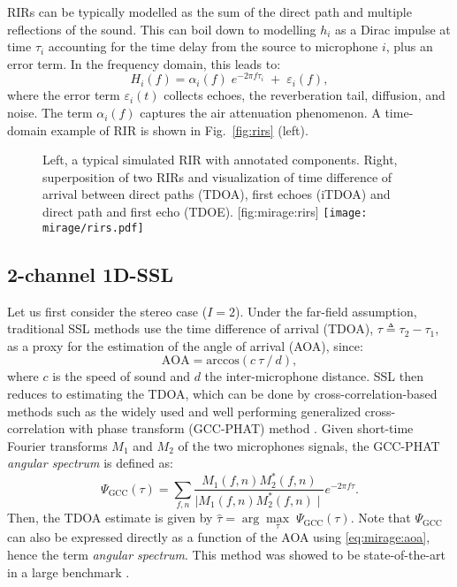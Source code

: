 RIRs can be typically modelled as the sum of the direct path and multiple reflections of the sound. This can boil down to modelling $h_i$ as a Dirac impulse at time $\tau_i$ accounting for the time delay from the source to microphone $i$, plus an error term. In the frequency domain, this leads to:
\begin{equation}\label{eq:mirage:rir}
H_i(f) = \alpha_i(f) \; e^{- 2 \pi f \tau_i} \; + \; \varepsilon_i(f),
\end{equation}
where the error term $\varepsilon_i(t)$ collects echoes, the reverberation tail, diffusion, and noise. The term $\alpha_i(f)$ captures the air attenuation phenomenon. A time-domain example of RIR is shown in Fig.~\cref{fig:rirs} (left).



\begin{figure}[t]
    \begin{sidecaption}{%
        Left, a typical simulated RIR with annotated components. Right, superposition of two RIRs and visualization of time difference
        of arrival between direct paths (TDOA), first echoes (iTDOA) and direct path and first echo (TDOE).
    }[fig:mirage:rirs]
    \centering
    \texttt{[image: mirage/rirs.pdf]}
    \end{sidecaption}
\end{figure}


\subsection{2-channel 1D-SSL}\label{subsec:mirage:1D-SSL}
Let us first consider the stereo case ($I=2$). Under the far-field assumption,
traditional SSL methods use the time difference of arrival (TDOA),
$\tau \triangleq \tau_2 - \tau_1$, as a proxy for the estimation of the angle of arrival (AOA), since:
\begin{equation}\label{eq:mirage:aoa}
\text{AOA} = \text{arccos} \left(c \: \tau \: / \:d \right),
\end{equation}
where $c$ is the speed of sound and $d$ the inter-microphone distance.
SSL then reduces to estimating the TDOA, which can be done by cross-correlation-based methods such as
the widely used and well performing generalized cross-correlation
with phase transform (GCC-PHAT) method .
Given short-time Fourier transforms $M_1$ and $M_2$ of the two microphones signals,
the GCC-PHAT \textit{angular spectrum} is defined as:
\begin{equation}\label{eq:mirage:gccphatcontrast}
\Psi_\text{GCC}(\tau) = \sum_{f,n}\frac{M_1(f,n) M_2^*(f,n)}{\mid M_1(f,n) M_2^*(f,n) \mid} e^{-2\pi f \tau}.
\end{equation}
Then, the TDOA estimate is given by $\hat{\tau} = \arg \underset{\tau}{\max} \; \Psi_\text{GCC}(\tau)$.
Note that $\Psi_\text{GCC}$ can also be expressed directly as a function of the
AOA using \eqref{eq:mirage:aoa}, hence the term \textit{angular spectrum}.
This method was showed to be state-of-the-art in a large benchmark .

